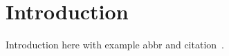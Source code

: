\chapter{Introduction}
\label{chap:introduction}

Introduction here with example \gls{abbr} and citation~\cite{Ran12}.